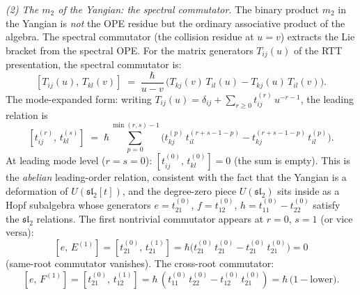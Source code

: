 \begin{computation}
\medskip
\noindent\emph{(2) The $m_2$ of the Yangian: the spectral
commutator.}
The binary product $m_2$ in the Yangian is
\emph{not} the OPE residue but the ordinary associative
product of the algebra. The spectral commutator
(the collision residue at $u = v$) extracts the Lie
bracket from the spectral OPE. For the matrix generators
$T_{ij}(u)$ of the RTT presentation, the spectral
commutator is:
\begin{equation}\label{eq:yangian-m2}
[T_{ij}(u),\,T_{kl}(v)]
\;=\;
\frac{\hbar}{u{-}v}\,
\bigl(T_{kj}(v)\,T_{il}(u) - T_{kj}(u)\,T_{il}(v)\bigr).
\end{equation}
The mode-expanded form: writing
$T_{ij}(u) = \delta_{ij} + \sum_{r\ge 0}
t_{ij}^{(r)}\,u^{-r-1}$, the leading relation is
\begin{equation}\label{eq:yangian-mode-comm}
[t_{ij}^{(r)},\,t_{kl}^{(s)}]
\;=\;
\hbar\sum_{p=0}^{\min(r,s)-1}
\bigl(t_{kj}^{(p)}\,t_{il}^{(r+s-1-p)}
- t_{kj}^{(r+s-1-p)}\,t_{il}^{(p)}\bigr).
\end{equation}
At leading mode level ($r = s = 0$):
$[t_{ij}^{(0)},\,t_{kl}^{(0)}] = 0$ (the sum is empty).
This is the \emph{abelian} leading-order relation,
consistent with the fact that the Yangian is a
deformation of $U(\mathfrak{sl}_2[t])$, and the
degree-zero piece $U(\mathfrak{sl}_2)$ sits inside
as a Hopf subalgebra whose generators
$e = t_{21}^{(0)}$, $f = t_{12}^{(0)}$,
$h = t_{11}^{(0)} - t_{22}^{(0)}$ satisfy the
$\mathfrak{sl}_2$ relations.
The first nontrivial commutator appears at $r = 0$,
$s = 1$ (or vice versa):
\[
[e,\,E^{(1)}]
= [t_{21}^{(0)},\,t_{21}^{(1)}]
= \hbar\bigl(t_{21}^{(0)}\,t_{21}^{(0)}
 - t_{21}^{(0)}\,t_{21}^{(0)}\bigr) = 0
\]
(same-root commutator vanishes). The cross-root
commutator:
\[
[e,\,F^{(1)}]
= [t_{21}^{(0)},\,t_{12}^{(1)}]
= \hbar\,(t_{11}^{(0)}\,t_{22}^{(0)} - t_{12}^{(0)}\,t_{21}^{(0)})
= \hbar\,\bigl(1 - \text{lower}\bigr).
\]


\end{computation}
